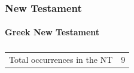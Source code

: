			
		
		
	\subsubsection{New Testament} %
		\label{ORDER-NT}
	
	
			
			
		\paragraph{Greek New Testament} %
			\label{ORDER-GREEK}
		
			\subparagraph{\texorpdfstring{}{}}
				\label{TAXIS}
				
				\begin{tabular}{ll}
					Total occurrences in the NT & 9 %
				\end{tabular}
				
